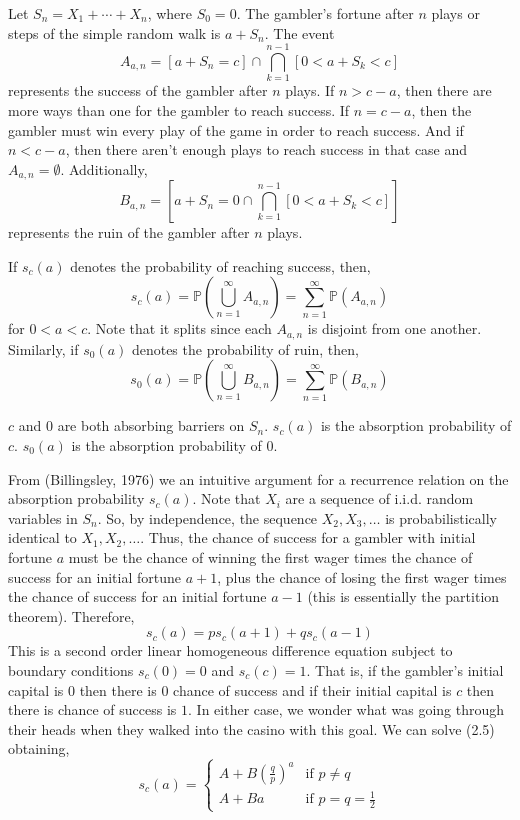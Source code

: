 \documentclass[12pt]{article}
\theoremstyle{definition}
\numberwithin{equation}{section}
\newcommand{\Pro}{\ensuremath{\mathbb{P}}}
\begin{document}
Let $S_n = X_1 + \cdots + X_n$, where $S_0 = 0$. The gambler's fortune after $n$ plays or steps of the simple random walk is $a + S_n$. The event
\begin{equation}
    A_{a,n} = [a + S_n = c] \cap \bigcap_{k=1}^{n-1}[0<a+S_k < c]
\end{equation}
represents the success of the gambler after $n$ plays. If $n> c - a$, then there are more ways than one for the gambler to reach success. If $n = c-a$, then the gambler must win every play of the game in order to reach success. And if $n < c-a$, then there aren't enough plays to reach success in that case and $A_{a,n} = \emptyset$. Additionally,
\begin{equation}
    B_{a,n} = [a + S_n = 0 \cap \bigcap_{k = 1}^{n-1}[0<a+S_k<c]]
\end{equation}
represents the ruin of the gambler after $n$ plays.

If $s_c(a)$ denotes the probability of reaching success, then,
\begin{equation}
    s_c(a) = \Pro( \bigcup_{n=1}^\infty A_{a,n}  )  = \sum_{n = 1}^\infty \Pro(A_{a,n})
\end{equation}
for $0<a<c$. Note that it splits since each $A_{a,n}$ is disjoint from one another. Similarly, if $s_0(a)$ denotes the probability of ruin, then,
\begin{equation}
    s_0(a) = \Pro(\bigcup_{n=1}^\infty B_{a,n}) = \sum_{n=1}^\infty \Pro(B_{a,n})
\end{equation}

$c$ and $0$ are both absorbing barriers on $S_n$. $s_c(a)$ is the absorption probability of $c$. $s_0(a)$ is the absorption probability of $0$. 

From (Billingsley, 1976) we an intuitive argument for a recurrence relation on the absorption probability $s_c(a)$. Note that $X_i$ are a sequence of i.i.d. random variables in $S_n$. So, by independence, the sequence $X_2 , X_3, \ldots$ is probabilistically identical to $X_1 , X_2 , \ldots$. Thus, the chance of success
for a gambler with initial fortune $a$ must be the chance of winning the first
wager times the chance of success for an initial fortune $a + 1$, plus the
chance of losing the first wager times the chance of success for an initial
fortune $a - 1$ (this is essentially the partition theorem). Therefore,
\begin{equation}
    s_{c}(a) = ps_c(a+1) + qs_c(a-1)
\end{equation}
This is a second order linear homogeneous difference equation subject to boundary conditions $s_c(0) = 0$ and $s_c(c) =1$. That is, if the gambler's initial capital is $0$ then there is $0$ chance of success and if their initial capital is $c$ then there is chance of success is $1$. In either case, we wonder what was going through their heads when they walked into the casino with this goal. We can solve (2.5) obtaining,
\begin{equation}
    s_c(a) = \begin{cases}
        A + B(\frac{q}{p})^a & \text{if } p\neq q \\
        A + Ba & \text{if } p = q = \frac{1}{2}
    \end{cases}
\end{equation}
\end{document}
